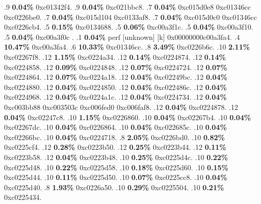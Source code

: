 \begin{profile}
{.9 \textbf{0.04\%} 0xc01342f4. 
.9 \textbf{0.04\%} 0xc021bbc8. 
.7 \textbf{0.04\%} 0xc015d0e8\newline {} 0xc01346cc\newline {} 0xc0226be0. 
.7 \textbf{0.04\%} 0xc015d104\newline {} 0xc0133af8. 
.7 \textbf{0.04\%} 0xc015d0c0\newline {} 0xc01346cc\newline {} 0xc0226cb4. 
.5 \textbf{0.15\%} 0xc0134688. 
.5 \textbf{0.06\%} 0xc00a3f1c. 
.5 \textbf{0.04\%} 0xc00a3f10. 
.5 \textbf{0.04\%} 0xc00a3f0c\newline {} . 
.1 \textbf{ 0.04\%} perf             [unknown]              [k] 0x00000000c00a3fa4. 
.4 \textbf{10.47\%} 0xc00a3fa4. 
.6 \textbf{10.33\%} 0xc01346cc. 
.8 \textbf{3.49\%} 0xc0226b6c. 
.10 \textbf{2.11\%} 0xc02267f8. 
.12 \textbf{1.15\%} 0xc0224a34. 
.12 \textbf{0.14\%} 0xc0224874. 
.12 \textbf{0.14\%} 0xc0224858. 
.12 \textbf{0.09\%} 0xc0224848. 
.12 \textbf{0.07\%} 0xc0224724. 
.12 \textbf{0.07\%} 0xc0224864. 
.12 \textbf{0.07\%} 0xc0224a18. 
.12 \textbf{0.04\%} 0xc02249bc. 
.12 \textbf{0.04\%} 0xc0224880. 
.12 \textbf{0.04\%} 0xc0224850. 
.12 \textbf{0.04\%} 0xc022486c. 
.12 \textbf{0.04\%} 0xc0224968. 
.12 \textbf{0.04\%} 0xc0224a1c. 
.12 \textbf{0.04\%} 0xc0224734. 
.12 \textbf{0.04\%} 0xc003bb88\newline {} 0xc003503c\newline {} 0xc006fed0\newline {} 0xc006faf8. 
.12 \textbf{0.04\%} 0xc0224878. 
.12 \textbf{0.04\%} 0xc02247c8. 
.10 \textbf{1.15\%} 0xc0226860. 
.10 \textbf{0.04\%} 0xc02267b4. 
.10 \textbf{0.04\%} 0xc02267dc. 
.10 \textbf{0.04\%} 0xc0226864. 
.10 \textbf{0.04\%} 0xc022685c. 
.10 \textbf{0.04\%} 0xc02266bc. 
.10 \textbf{0.04\%} 0xc0224718. 
.8 \textbf{2.05\%} 0xc0226bd0. 
.10 \textbf{0.82\%} 0xc0225cf4. 
.12 \textbf{0.28\%} 0xc0223b50. 
.12 \textbf{0.25\%} 0xc0223b44. 
.12 \textbf{0.11\%} 0xc0223b58. 
.12 \textbf{0.04\%} 0xc0223b48. 
.10 \textbf{0.25\%} 0xc0225d4c. 
.10 \textbf{0.22\%} 0xc0225d48. 
.10 \textbf{0.22\%} 0xc0225d58. 
.10 \textbf{0.18\%} 0xc0225d60. 
.10 \textbf{0.15\%} 0xc0225d44. 
.10 \textbf{0.11\%} 0xc0225d50. 
.10 \textbf{0.07\%} 0xc0225cc8. 
.10 \textbf{0.04\%} 0xc0225d40. 
.8 \textbf{1.93\%} 0xc0226a50. 
.10 \textbf{0.29\%} 0xc0225504. 
.10 \textbf{0.21\%} 0xc0225434. 
}
\end{profile}
